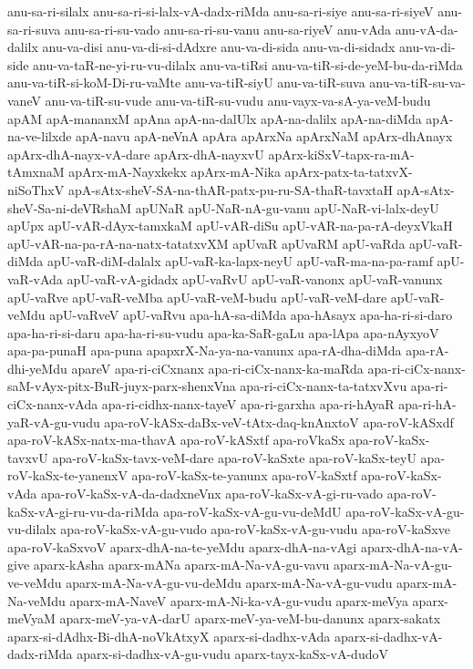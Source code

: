 {anu-sa-ri-silalx
anu-sa-ri-si-lalx-vA-dadx-riMda
anu-sa-ri-siye
anu-sa-ri-siyeV
anu-sa-ri-suva
anu-sa-ri-su-vado
anu-sa-ri-su-vanu
anu-sa-riyeV
anu-vAda
anu-vA-da-dalilx
anu-va-disi
anu-va-di-si-dAdxre
anu-va-di-sida
anu-va-di-sidadx
anu-va-di-side
anu-va-taR-ne-yi-ru-vu-dilalx
anu-va-tiRsi
anu-va-tiR-si-de-yeM-bu-da-riMda
anu-va-tiR-si-koM-Di-ru-vaMte
anu-va-tiR-siyU
anu-va-tiR-suva
anu-va-tiR-su-va-vaneV
anu-va-tiR-su-vude
anu-va-tiR-su-vudu
anu-vayx-va-sA-ya-veM-budu
apAM
apA-mananxM
apAna
apA-na-dalUlx
apA-na-dalilx
apA-na-diMda
apA-na-ve-lilxde
apA-navu
apA-neVnA
apAra
apArxNa
apArxNaM
apArx-dhAnayx
apArx-dhA-nayx-vA-dare
apArx-dhA-nayxvU
apArx-kiSxV-tapx-ra-mA-tAmxnaM
apArx-mA-Nayxkekx
apArx-mA-Nika
apArx-patx-ta-tatxvX-niSoThxV
apA-sAtx-sheV-SA-na-thAR-patx-pu-ru-SA-thaR-tavxtaH
apA-sAtx-sheV-Sa-ni-deVRshaM
apUNaR
apU-NaR-nA-gu-vanu
apU-NaR-vi-lalx-deyU
apUpx
apU-vAR-dAyx-tamxkaM
apU-vAR-diSu
apU-vAR-na-pa-rA-deyxVkaH
apU-vAR-na-pa-rA-na-natx-tatatxvXM
apUvaR
apUvaRM
apU-vaRda
apU-vaR-diMda
apU-vaR-diM-dalalx
apU-vaR-ka-lapx-neyU
apU-vaR-ma-na-pa-ramf
apU-vaR-vAda
apU-vaR-vA-gidadx
apU-vaRvU
apU-vaR-vanonx
apU-vaR-vanunx
apU-vaRve
apU-vaR-veMba
apU-vaR-veM-budu
apU-vaR-veM-dare
apU-vaR-veMdu
apU-vaRveV
apU-vaRvu
apa-hA-sa-diMda
apa-hAsayx
apa-ha-ri-si-daro
apa-ha-ri-si-daru
apa-ha-ri-su-vudu
apa-ka-SaR-gaLu
apa-lApa
apa-nAyxyoV
apa-pa-punaH
apa-puna
apapxrX-Na-ya-na-vanunx
apa-rA-dha-diMda
apa-rA-dhi-yeMdu
apareV
apa-ri-ciCxnanx
apa-ri-ciCx-nanx-ka-maRda
apa-ri-ciCx-nanx-saM-vAyx-pitx-BuR-juyx-parx-shenxVna
apa-ri-ciCx-nanx-ta-tatxvXvu
apa-ri-ciCx-nanx-vAda
apa-ri-cidhx-nanx-tayeV
apa-ri-garxha
apa-ri-hAyaR
apa-ri-hA-yaR-vA-gu-vudu
apa-roV-kASx-daBx-veV-tAtx-daq-knAnxtoV
apa-roV-kASxdf
apa-roV-kASx-natx-ma-thavA
apa-roV-kASxtf
apa-roVkaSx
apa-roV-kaSx-tavxvU
apa-roV-kaSx-tavx-veM-dare
apa-roV-kaSxte
apa-roV-kaSx-teyU
apa-roV-kaSx-te-yanenxV
apa-roV-kaSx-te-yanunx
apa-roV-kaSxtf
apa-roV-kaSx-vAda
apa-roV-kaSx-vA-da-dadxneVnx
apa-roV-kaSx-vA-gi-ru-vado
apa-roV-kaSx-vA-gi-ru-vu-da-riMda
apa-roV-kaSx-vA-gu-vu-deMdU
apa-roV-kaSx-vA-gu-vu-dilalx
apa-roV-kaSx-vA-gu-vudo
apa-roV-kaSx-vA-gu-vudu
apa-roV-kaSxve
apa-roV-kaSxvoV
aparx-dhA-na-te-yeMdu
aparx-dhA-na-vAgi
aparx-dhA-na-vA-give
aparx-kAsha
aparx-mANa
aparx-mA-Na-vA-gu-vavu
aparx-mA-Na-vA-gu-ve-veMdu
aparx-mA-Na-vA-gu-vu-deMdu
aparx-mA-Na-vA-gu-vudu
aparx-mA-Na-veMdu
aparx-mA-NaveV
aparx-mA-Ni-ka-vA-gu-vudu
aparx-meVya
aparx-meVyaM
aparx-meV-ya-vA-darU
aparx-meV-ya-veM-bu-danunx
aparx-sakatx
aparx-si-dAdhx-Bi-dhA-noVkAtxyX
aparx-si-dadhx-vAda
aparx-si-dadhx-vA-dadx-riMda
aparx-si-dadhx-vA-gu-vudu
aparx-tayx-kaSx-vA-dudoV
}
